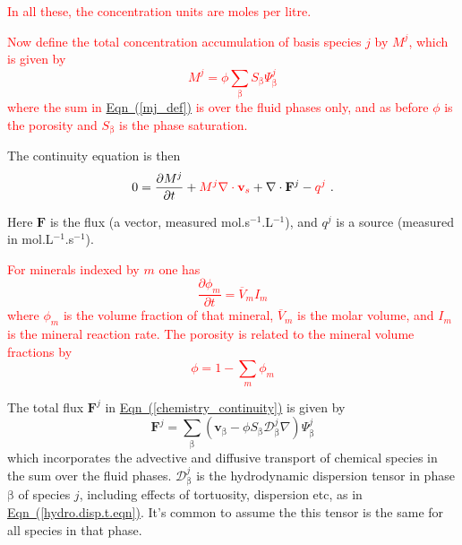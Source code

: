 \documentclass[12pt]{report}
\def\phase{\mathrm{\beta}}
\def\flux{\mathbf{F}}
\def\darcyvel{\mathbf{v}}
\begin{document}
\textcolor{red}{
In all these, the concentration units are moles per litre.
}

\textcolor{red}{
Now define the total concentration accumulation of basis species $j$
by $M^{j}$, which is given by
\begin{equation}
  \label{mj_def}
  M^{j}=\phi \sum_{\phase} S_{\phase} \Psi^{j}_{\phase}
\end{equation}
where the sum in \hyperref[mj_def]{Eqn~(\ref*{mj_def})} is over the
fluid phases only, and as before $\phi$ is the porosity and
$S_{\phase}$ is the phase saturation.  }

The continuity equation is then
\begin{equation}
0 = \frac{\partial M^{j}}{\partial t} + \textcolor{red}{M^{j}\nabla\cdot{\mathbf
  v}_{s}} + \nabla\cdot \flux^{j} - \textcolor{red}{q^{j}} \ .
\label{chemistry_continuity}
\end{equation}

Here $\flux$ is the flux (a vector, measured
mol.s$^{-1}$.L$^{-1}$), and $q^{j}$ is a source (measured in
mol.L$^{-1}$.s$^{-1}$).

\textcolor{red}{
For minerals indexed by $m$ one has
\begin{equation}
  \frac{\partial \phi_{m}}{\partial t} = \overline{V}_{m} I_{m}
\end{equation}
where $\phi_{m}$ is the volume fraction of that mineral,
$\overline{V}_{m}$ is the molar volume, and $I_{m}$ is the mineral
reaction rate. The porosity is related to the mineral volume fractions
by
\begin{equation}
  \phi=1-\sum_{m} \phi_{m}
\end{equation}
}

The total flux $\flux^{j}$ in
\hyperref[chemistry_continuity]{Eqn~(\ref*{chemistry_continuity})} is
given by
\begin{equation}
  \flux^{j}=\sum_{\phase} (\darcyvel_{\phase} - \phi S_{\phase} {\mathcal{D}}_{\phase}^{j} \nabla) \Psi_{\phase}^{j}
\end{equation}
which incorporates the advective and diffusive transport of chemical
species in the sum over the fluid phases. ${\mathcal{D}}_{\phase}^{j}$
is the hydrodynamic dispersion tensor in phase $\phase$ of species
$j$, including effects of tortuosity, dispersion etc, as in
\hyperref[hydro.disp.t.eqn]{Eqn~(\ref*{hydro.disp.t.eqn})}. It's
common to assume the this tensor is the same for all species in that
phase.
\end{document}
